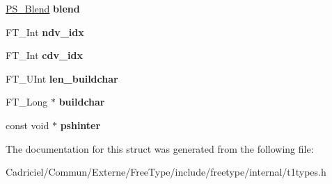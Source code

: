 \begin{DoxyCompactItemize}
\item 
\hypertarget{struct_t1___face_rec___a51e4e76f9988ec601d1fec6b5d4611db}{\hyperlink{struct_p_s___blend_rec__}{P\-S\-\_\-\-Blend} {\bfseries blend}}\label{struct_t1___face_rec___a51e4e76f9988ec601d1fec6b5d4611db}

\item 
\hypertarget{struct_t1___face_rec___a0ecadea7618642ccc351f81ac56ec266}{F\-T\-\_\-\-Int {\bfseries ndv\-\_\-idx}}\label{struct_t1___face_rec___a0ecadea7618642ccc351f81ac56ec266}

\item 
\hypertarget{struct_t1___face_rec___a7a77dcddf65ac6d86f1f62b3859d11d8}{F\-T\-\_\-\-Int {\bfseries cdv\-\_\-idx}}\label{struct_t1___face_rec___a7a77dcddf65ac6d86f1f62b3859d11d8}

\item 
\hypertarget{struct_t1___face_rec___a75554021d0baddb1c64f69fd8dbde86b}{F\-T\-\_\-\-U\-Int {\bfseries len\-\_\-buildchar}}\label{struct_t1___face_rec___a75554021d0baddb1c64f69fd8dbde86b}

\item 
\hypertarget{struct_t1___face_rec___af1fd890acaa0f423f7cc36807c42d75f}{F\-T\-\_\-\-Long $\ast$ {\bfseries buildchar}}\label{struct_t1___face_rec___af1fd890acaa0f423f7cc36807c42d75f}

\item 
\hypertarget{struct_t1___face_rec___a438e8ce8cbd53b7e205b17f95e7b2106}{const void $\ast$ {\bfseries pshinter}}\label{struct_t1___face_rec___a438e8ce8cbd53b7e205b17f95e7b2106}

\end{DoxyCompactItemize}


The documentation for this struct was generated from the following file\-:\begin{DoxyCompactItemize}
\item 
Cadriciel/\-Commun/\-Externe/\-Free\-Type/include/freetype/internal/t1types.\-h\end{DoxyCompactItemize}
